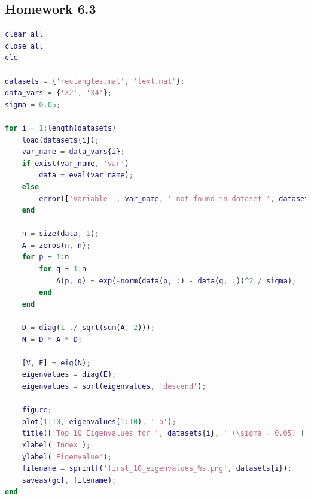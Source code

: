 \documentclass[11pt]{article}
\begin{document}
\subsection{Homework 6.3}
\begin{lstlisting}[language = matlab]
clear all
close all
clc

datasets = {'rectangles.mat', 'text.mat'};
data_vars = {'X2', 'X4'}; 
sigma = 0.05; 

for i = 1:length(datasets)
    load(datasets{i});
    var_name = data_vars{i};
    if exist(var_name, 'var')
        data = eval(var_name); 
    else
        error(['Variable ', var_name, ' not found in dataset ', datasets{i}]);
    end

    n = size(data, 1);
    A = zeros(n, n);
    for p = 1:n
        for q = 1:n
            A(p, q) = exp(-norm(data(p, :) - data(q, :))^2 / sigma);
        end
    end

    D = diag(1 ./ sqrt(sum(A, 2)));
    N = D * A * D;

    [V, E] = eig(N); 
    eigenvalues = diag(E); 
    eigenvalues = sort(eigenvalues, 'descend');

    figure;
    plot(1:10, eigenvalues(1:10), '-o');
    title(['Top 10 Eigenvalues for ', datasets{i}, ' (\sigma = 0.05)']);
    xlabel('Index');
    ylabel('Eigenvalue');
    filename = sprintf('first_10_eigenvalues_%s.png', datasets{i}); 
    saveas(gcf, filename);
end

\end{lstlisting}
\end{document}
